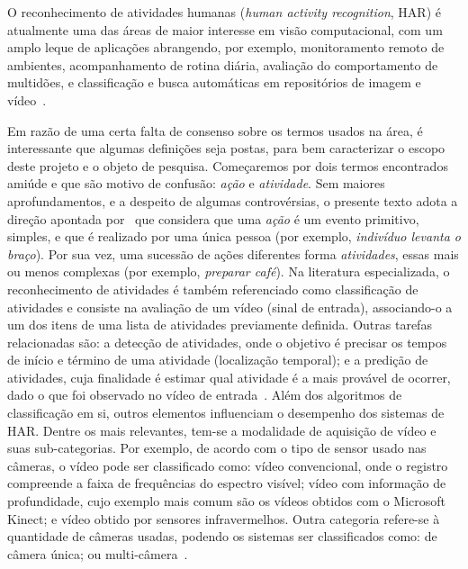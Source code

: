 O reconhecimento de atividades humanas (\emph{human activity recognition}, HAR) é atualmente uma das áreas de maior interesse em visão computacional, com um amplo leque de aplicações abrangendo, por exemplo, monitoramento remoto de ambientes, acompanhamento de rotina diária, avaliação do comportamento de multidões, e classificação e busca automáticas em repositórios de imagem e vídeo~\parencite{hussain-2020,jegham-2020}.
%

Em razão de uma certa falta de consenso sobre os termos usados na área, é interessante que algumas definições seja postas, para bem caracterizar o escopo deste projeto e o objeto de pesquisa. 
Começaremos por dois termos encontrados amiúde e que são motivo de confusão: \emph{ação} e \emph{atividade}. Sem maiores aprofundamentos, e a despeito de algumas controvérsias, o presente texto adota a direção apontada por~\textcite{herath-2017} que considera que uma \emph{ação} é um evento primitivo, simples, e que é realizado por uma única pessoa (por exemplo, \emph{indivíduo levanta o braço}). Por sua vez, uma sucessão de ações diferentes forma \emph{atividades}, essas mais ou menos complexas (por exemplo, \emph{preparar café}).
%
Na literatura especializada, o reconhecimento de atividades é também referenciado como classificação de atividades e consiste na avaliação de um vídeo (sinal de entrada), associando-o a um dos itens de uma lista de atividades previamente definida. Outras tarefas relacionadas são: a detecção de atividades, onde o objetivo é precisar os tempos de início e término de uma atividade (localização temporal); e a predição de atividades, cuja finalidade é estimar qual atividade é a mais provável de  ocorrer, dado o que foi observado no vídeo de entrada~\parencite{yao-2019}.%
%
Além dos algoritmos de classificação em si, outros elementos influenciam o desempenho dos sistemas de HAR. Dentre os mais relevantes, tem-se a modalidade de aquisição de vídeo e suas sub-categorias. Por exemplo, de acordo com o tipo de sensor usado nas câmeras, o vídeo pode ser classificado como: vídeo convencional, onde o registro compreende a faixa de frequências do espectro visível; vídeo com informação de profundidade, cujo exemplo mais comum são os vídeos obtidos com o Microsoft Kinect; e vídeo obtido por sensores infravermelhos. Outra categoria refere-se à quantidade de câmeras usadas, podendo os sistemas ser classificados como: de câmera única; ou multi-câmera~\parencite{yao-2019}.

